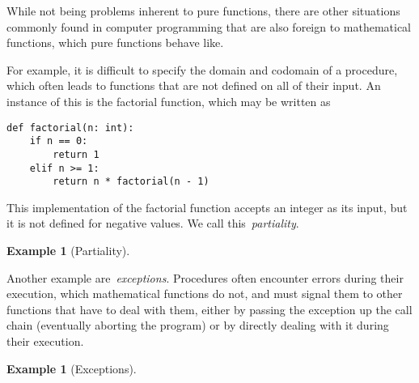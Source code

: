 \documentclass[a4paper]{article}
\theoremstyle{plain}
\newtheorem{example}[theorem]{Example}
\theoremstyle{definition}
\begin{document}
While not being problems inherent to pure functions, there are other situations
commonly found in computer programming that are also foreign to mathematical
functions, which pure functions behave like.

For example, it is difficult to specify the domain and codomain of a procedure,
which often leads to functions that are not defined on all of their input. An
instance of this is the factorial function, which may be written as
\begin{verbatim}
def factorial(n: int):
    if n == 0:
        return 1
    elif n >= 1:
        return n * factorial(n - 1)
\end{verbatim}
This implementation of the factorial function accepts an integer as its input,
but it is not defined for negative values. We call this~\emph{partiality}.

\begin{example}[Partiality]
\end{example}

Another example are~\emph{exceptions}. Procedures often encounter errors during
their execution, which mathematical functions do not, and must signal them to
other functions that have to deal with them, either by passing the exception up
the call chain (eventually aborting the program) or by directly dealing with it
during their execution.

\begin{example}[Exceptions]
\end{example}
\end{document}
